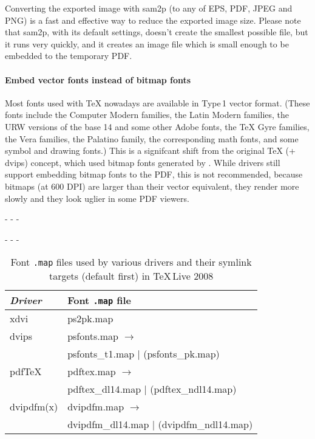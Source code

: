 \documentclass{ltugproc}
\def\cmd{\textsf}
\def\pkg{\textsf}
\def\captiontop#1{%
  \advance\abovecaptionskip-\belowcaptionskip
  \advance\belowcaptionskip\abovecaptionskip
  \advance\abovecaptionskip-\belowcaptionskip
  \abovecaptionskip-\abovecaptionskip
  \caption{#1}%
  \advance\abovecaptionskip-\belowcaptionskip
  \advance\belowcaptionskip\abovecaptionskip
  \advance\abovecaptionskip-\belowcaptionskip
  \abovecaptionskip-\abovecaptionskip
}
\begin{document}
Converting the exported image with \cmd{sam2p} (to any of EPS, PDF, JPEG and
PNG) is a fast and effective way to reduce the exported image size. Please
note that \cmd{sam2p}, with its default settings, doesn't create the
smallest possible file, but it runs very quickly, and it creates an image
file which is small enough to be embedded to the temporary PDF.

\paragraph{Embed vector fonts instead of bitmap fonts}

Most fonts used with \TeX{} nowadays are available in Type\,1 vector format.
(These fonts include the Computer Modern families, the Latin Modern families,
the URW versions of the base 14 and some other Adobe fonts,
the \TeX{} Gyre families, the Vera families, the Palatino family, the
corresponding math fonts, and some symbol and drawing fonts.) This is a
signifcant shift from the original \TeX{} (+ \cmd{dvips}) concept, which used
bitmap fonts generated by \MF{}. While drivers still support embedding
bitmap fonts to the PDF, this is not recommended, because bitmaps (at 600
DPI) are larger than their vector equivalent, they render more slowly and
they look uglier in some PDF viewers.

\begin{table}
\captiontop{Font \texttt{.map} files used by various drivers and their
symlink targets (default first) in \TeX{}\,Live 2008}\label{tab:mapfiles}
\par\small\noindent\hfil
\begin{tabular*}{\hsize}{@{\extracolsep{\fill}}ll@{}}
\toprule
\emph{Driver} & Font \texttt{.map} file\\
\midrule
\cmd{xdvi} & \pkg{ps2pk.map} \\
\cmd{dvips}& \pkg{psfonts.map} $\to$\\
           & \pkg{psfonts\_t1.map} $|$ (\pkg{psfonts\_pk.map}) \\
pdf\TeX{}  & \pkg{pdftex.map} $\to$\\
           & \pkg{pdftex\_dl14.map} $|$ (\pkg{pdftex\_ndl14.map}) \\
\cmd{dvipdfm(x)}& \pkg{dvipdfm.map} $\to$\\
                & \pkg{dvipdfm\_dl14.map} $|$ (\pkg{dvipdfm\_ndl14.map}) \\
\bottomrule
\end{tabular*}
\end{table}
\end{document}
